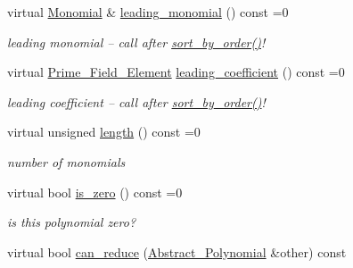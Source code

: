 \begin{Indent}
\begin{DoxyCompactItemize}
\mbox{\label{class_abstract___polynomial_a9186ed0f55c5cc4ecb1b9bc11ba9f679}} 
virtual \hyperlink{class_monomial}{Monomial} \& \hyperlink{class_abstract___polynomial_a9186ed0f55c5cc4ecb1b9bc11ba9f679}{leading\+\_\+monomial} () const =0
\begin{DoxyCompactList}\small\item\em leading monomial -- call after \hyperlink{class_abstract___polynomial_a1fcdd29c324c660ea935197c39e682f2}{sort\+\_\+by\+\_\+order()}! \end{DoxyCompactList}\item 
\mbox{\label{class_abstract___polynomial_a511ce8e997fe3fd1141293d256e25fad}} 
virtual \hyperlink{class_prime___field___element}{Prime\+\_\+\+Field\+\_\+\+Element} \hyperlink{class_abstract___polynomial_a511ce8e997fe3fd1141293d256e25fad}{leading\+\_\+coefficient} () const =0
\begin{DoxyCompactList}\small\item\em leading coefficient -- call after \hyperlink{class_abstract___polynomial_a1fcdd29c324c660ea935197c39e682f2}{sort\+\_\+by\+\_\+order()}! \end{DoxyCompactList}\item 
\mbox{\label{class_abstract___polynomial_a48f4c3c030ca66a9386cd71f71d5def7}} 
virtual unsigned \hyperlink{class_abstract___polynomial_a48f4c3c030ca66a9386cd71f71d5def7}{length} () const =0
\begin{DoxyCompactList}\small\item\em number of monomials \end{DoxyCompactList}\item 
\mbox{\label{class_abstract___polynomial_afb4895702dd56895a792850a831c2f51}} 
virtual bool \hyperlink{class_abstract___polynomial_afb4895702dd56895a792850a831c2f51}{is\+\_\+zero} () const =0
\begin{DoxyCompactList}\small\item\em is this polynomial zero? \end{DoxyCompactList}\item 
\mbox{\label{class_abstract___polynomial_af43d43a17c02c38c3ba3e71710e226bf}} 
virtual bool \hyperlink{class_abstract___polynomial_af43d43a17c02c38c3ba3e71710e226bf}{can\+\_\+reduce} (\hyperlink{class_abstract___polynomial}{Abstract\+\_\+\+Polynomial} \&other) const

\end{DoxyCompactItemize}
\end{Indent}
